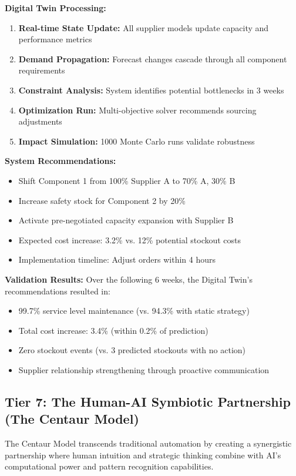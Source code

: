 \documentclass{article}
\begin{document}
\textbf{Digital Twin Processing:}
\begin{enumerate}
\item \textbf{Real-time State Update:} All supplier models update capacity and performance metrics
\item \textbf{Demand Propagation:} Forecast changes cascade through all component requirements
\item \textbf{Constraint Analysis:} System identifies potential bottlenecks in 3 weeks
\item \textbf{Optimization Run:} Multi-objective solver recommends sourcing adjustments
\item \textbf{Impact Simulation:} 1000 Monte Carlo runs validate robustness
\end{enumerate}

\textbf{System Recommendations:}
\begin{itemize}
\item Shift Component 1 from 100\% Supplier A to 70\% A, 30\% B
\item Increase safety stock for Component 2 by 20\%
\item Activate pre-negotiated capacity expansion with Supplier B
\item Expected cost increase: 3.2\% vs. 12\% potential stockout costs
\item Implementation timeline: Adjust orders within 4 hours
\end{itemize}

\textbf{Validation Results:}
Over the following 6 weeks, the Digital Twin's recommendations resulted in:
\begin{itemize}
\item 99.7\% service level maintenance (vs. 94.3\% with static strategy)
\item Total cost increase: 3.4\% (within 0.2\% of prediction)
\item Zero stockout events (vs. 3 predicted stockouts with no action)
\item Supplier relationship strengthening through proactive communication
\end{itemize}

\subsection{Tier 7: The Human-AI Symbiotic Partnership (The Centaur Model)}

The Centaur Model transcends traditional automation by creating a synergistic partnership where human intuition and strategic thinking combine with AI's computational power and pattern recognition capabilities.
\end{document}
